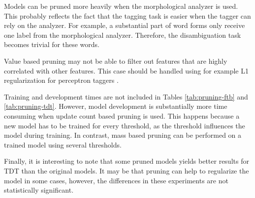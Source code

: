 Models can be pruned more heavily when the morphological analyzer is
used. This probably reflects the fact that the tagging task is easier
when the tagger can rely on the analyzer. For example, a substantial
part of word forms only receive one label from the morphological
analyzer. Therefore, the disambiguation task becomes trivial for these
words.

Value based pruning may not be able to filter out features that are
highly correlated with other features. This case should be handled
using for example L1 regularization for perceptron taggers
\cite{Zhang2014}. 

Training and development times are not included in Tables
\ref{tab:pruning-ftb} and \ref{tab:pruning-tdt}. However, model
development is substantially more time consuming when update count
based pruning is used. This happens because a new model has to be
trained for every threshold, as the threshold influences the model
during training. In contrast, mass based pruning can be performed on a
trained model using several thresholds.

Finally, it is interesting to note that some pruned models yields
better results for TDT than the original models. It may be that
pruning can help to regularize the model in some cases, however, the
differences in these experiments are not statistically significant.



